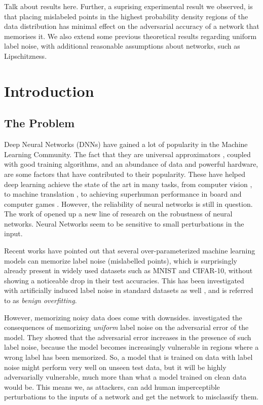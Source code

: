 \documentclass{ociamthesis}
\begin{document}
Talk about results here. Further, a suprising experimental result we observed,
is that placing mislabeled points in the highest probability density regions of
the data distribution has minimal effect on the adversarial accuracy of a
network that memorises it. We also extend some previous theoretical results
regarding uniform label noise, with additional reasonable assumptions about
networks, such as Lipschitzness.

\tableofcontents

\chapter{Introduction}

\section{The Problem}

Deep Neural Networks (DNNs) have gained a lot of popularity in the Machine
Learning Community. The fact that they are universal approximators
\citep{hornik1989multilayer}, coupled with good training algorithms, and an
abundance of data and powerful hardware, are some factors that have contributed
to their popularity. These have helped deep learning achieve the state of the
art in many tasks, from computer vision \citep{imagenet}, to machine translation
\citep{seq2seq,attention-is-all-you-need}, to achieving superhuman performance
in board and computer games \citep{alpha-zero, starcraft}. However, the
reliability of neural networks is still in question. The work of \citet{42503}
opened up a new line of research on the robustness of neural networks. Neural
Networks seem to be sensitive to small perturbations in the input.

Recent works \citep{belkin2018understand,DBLP:journals/cacm/ZhangBHRV21} have
pointed out that several over-parameterized machine learning models can memorize
label noise (mislabelled points), which is surprisingly already present in
widely used datasets \citep{sanyal2021how} such as MNIST and CIFAR-10, without
showing a noticeable drop in their test accuracies. This has been investigated
with artificially induced label noise in standard datasets as well
\citep{sanyal2021how}, and is referred to as \emph{benign overfitting}.

However, memorizing noisy data does come with downsides. \citet{sanyal2021how}
investigated the consequences of memorizing \emph{uniform} label noise on the
adversarial error of the model. They showed that the adversarial error increases
in the presence of such label noise, because the model becomes increasingly
vulnerable in regions where a wrong label has been memorized. So, a model that
is trained on data with label noise might perform very well on unseen test data,
but it will be highly adversarially vulnerable, much more than what a model
trained on clean data would be. This means we, as attackers, can add human
imperceptible perturbations to the inputs of a network and get the network to
misclassify them.
\end{document}
